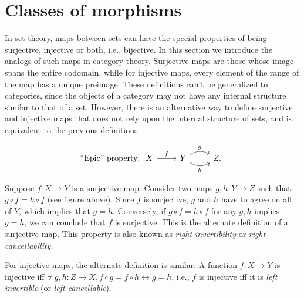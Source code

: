 \section{Classes of morphisms}\label{sec: classes of morphisms}

In set theory, maps between sets can have the special properties of
being surjective, injective or both, i.e., bijective. In this section
we introduce the analogs of such maps in category theory. Surjective
maps are those whose image spans the entire codomain, while for injective
maps, every element of the range of the map has a unique preimage.
These definitions can't be generalized to categories, since the objects
of a category may not have any internal structure similar to that
of a set. However, there is an alternative way to define surjective
and injective maps that does not rely upon the internal structure
of sets, and is equivalent to the previous definitions.

\[\text{``Epic'' property:}\; 
\begin{tikzcd} 
X \arrow[r, "f"] & Y \arrow[r, bend left, "g"] \arrow[r, bend right, "h"'] & Z. 
\end{tikzcd}\]

Suppose $f:X\rightarrow Y$ is a surjective map. Consider two maps
$g,h:Y\rightarrow Z$ such that $g\circ f=h\circ f$ (see figure above).
Since $f$ is surjective, $g$ and $h$ have to agree on all of $Y$,
which implies that $g=h$. Conversely, if $g\circ f=h\circ f$ for
any $g,h$ implies $g=h$, we can conclude that $f$ is surjective.
This is the alternate definition of a surjective map. This property
is also known as \emph{right invertibility} or \emph{right cancellability}.

For injective maps, the alternate definition is similar. A function
$f:X\rightarrow Y$ is injective iff $\forall~g,h:Z\rightarrow X,f\circ g=f\circ h\longleftrightarrow g=h$,
i.e., $f$ is injective iff it is \emph{left invertible} (or \emph{left
cancellable}).

